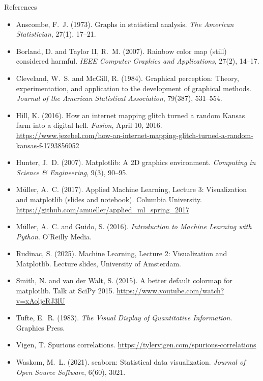 \documentclass[handout,aspectratio=169,t,9pt]{beamer}
\begin{document}
\begin{frame}{References}
  \scriptsize
  \begin{itemize}
    \item Anscombe, F.~J. (1973).  Graphs in statistical analysis.
          \emph{The American Statistician}, 27(1), 17--21.
    \item Borland, D. and Taylor II, R.~M. (2007).  Rainbow color map
          (still) considered harmful.  \emph{IEEE Computer Graphics and
          Applications}, 27(2), 14--17.
    \item Cleveland, W.~S. and McGill, R. (1984).  Graphical perception:
          Theory, experimentation, and application to the development of
          graphical methods.  \emph{Journal of the American Statistical
          Association}, 79(387), 531--554.
    \item Hill, K. (2016).  How an internet mapping glitch turned a random
          Kansas farm into a digital hell.  \emph{Fusion}, April 10, 2016.
          \url{https://www.jezebel.com/how-an-internet-mapping-glitch-turned-a-random-kansas-f-1793856052}
    \item Hunter, J.~D. (2007).  Matplotlib: A 2D graphics environment.
          \emph{Computing in Science \& Engineering}, 9(3), 90--95.
    \item M\"{u}ller, A.~C. (2017).  Applied Machine Learning, Lecture 3:
          Visualization and matplotlib (slides and notebook).  Columbia
          University.  \url{https://github.com/amueller/applied_ml_spring_2017}
    \item M\"{u}ller, A.~C. and Guido, S. (2016).  \emph{Introduction to
          Machine Learning with Python}.  O'Reilly Media.
    \item Rudinac, S. (2025).  Machine Learning, Lecture 2: Visualization
          and Matplotlib.  Lecture slides, University of Amsterdam.
    \item Smith, N. and van der Walt, S. (2015).  A better default colormap
          for matplotlib.  Talk at SciPy 2015.
          \url{https://www.youtube.com/watch?v=xAoljeRJ3lU}
    \item Tufte, E.~R. (1983).  \emph{The Visual Display of Quantitative
          Information}.  Graphics Press.
    \item Vigen, T.  Spurious correlations.
          \url{https://tylervigen.com/spurious-correlations}
    \item Waskom, M.~L. (2021).  seaborn: Statistical data visualization.
          \emph{Journal of Open Source Software}, 6(60), 3021.
  \end{itemize}
\end{frame}
\end{document}

